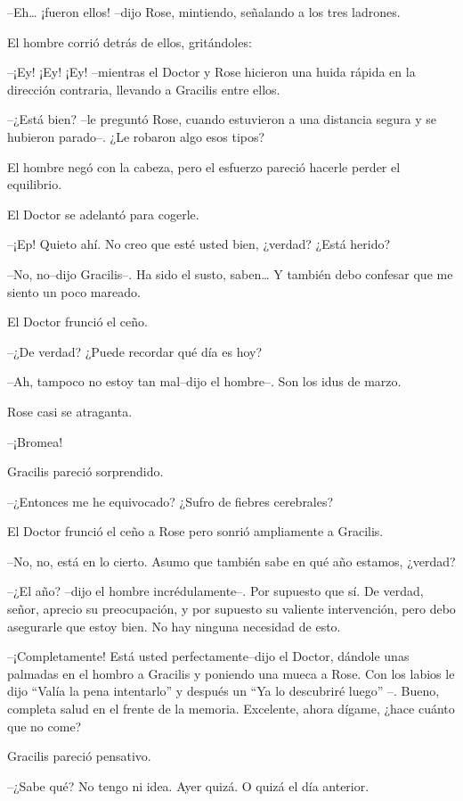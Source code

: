 --Eh\ldots{} ¡fueron ellos! --dijo Rose, mintiendo, señalando a los tres
ladrones.

El hombre corrió detrás de ellos, gritándoles:

--¡Ey! ¡Ey! ¡Ey! --mientras el Doctor y Rose hicieron una huida rápida
en la dirección contraria, llevando a Gracilis entre ellos.

--¿Está bien? --le preguntó Rose, cuando estuvieron a una distancia
segura y se hubieron parado--. ¿Le robaron algo esos tipos?

El hombre negó con la cabeza, pero el esfuerzo pareció hacerle perder el
equilibrio.

El Doctor se adelantó para cogerle.

--¡Ep! Quieto ahí. No creo que esté usted bien, ¿verdad? ¿Está herido?

--No, no--dijo Gracilis--. Ha sido el susto, saben\ldots{} Y también
debo confesar que me siento un poco mareado.

El Doctor frunció el ceño.

--¿De verdad? ¿Puede recordar qué día es hoy?

--Ah, tampoco no estoy tan mal--dijo el hombre--. Son los idus de marzo.

Rose casi se atraganta.

--¡Bromea!

Gracilis pareció sorprendido.

--¿Entonces me he equivocado? ¿Sufro de fiebres cerebrales?

El Doctor frunció el ceño a Rose pero sonrió ampliamente a Gracilis.

--No, no, está en lo cierto. Asumo que también sabe en qué año estamos,
¿verdad?

--¿El año? --dijo el hombre incrédulamente--. Por supuesto que sí. De
verdad, señor, aprecio su preocupación, y por supuesto su valiente
intervención, pero debo asegurarle que estoy bien. No hay ninguna
necesidad de esto.

--¡Completamente! Está usted perfectamente--dijo el Doctor, dándole unas
palmadas en el hombro a Gracilis y poniendo una mueca a Rose. Con los
labios le dijo ``Valía la pena intentarlo'' y después un ``Ya lo
descubriré luego'' --. Bueno, completa salud en el frente de la memoria.
Excelente, ahora dígame, ¿hace cuánto que no come?

Gracilis pareció pensativo.

--¿Sabe qué? No tengo ni idea. Ayer quizá. O quizá el día anterior.

